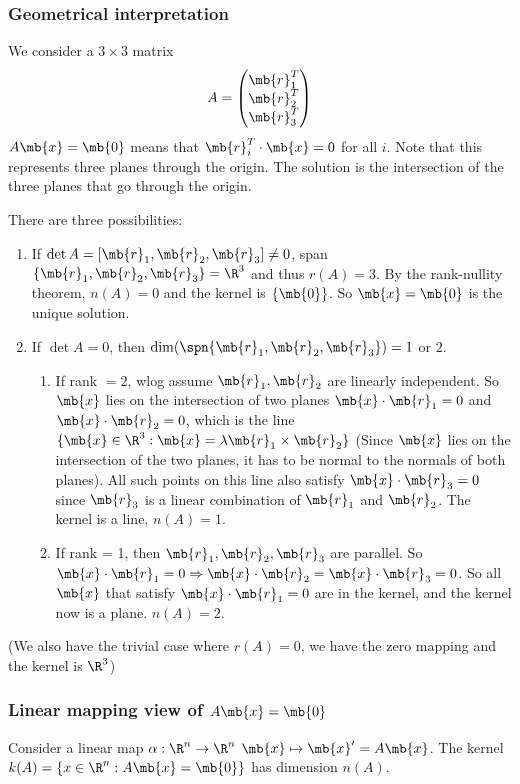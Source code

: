 \documentclass[a4paper]{article}
\begin{document}
\subsubsection{Geometrical interpretation}
We consider a $3\times 3$ matrix
\[
A = \begin{pmatrix} \mb{r}_1^T\\\mb{r}_2^T\\\mb{r}_3^T\end{pmatrix}
\]
$A\mb{x} = \mb{0}$ means that $\mb{r}_i^T\cdot \mb{x} = 0$ for all $i$. Note that this represents three planes through the origin. The solution is the intersection of the three planes that go through the origin.

There are three possibilities:
\begin{enumerate}
\item If $\det A =[\mb{r}_1, \mb{r}_2, \mb{r}_3] \not= 0$, span$\{\mb{r}_1, \mb{r}_2, \mb{r}_3\} = \R^3$ and thus $r(A) = 3$. By the rank-nullity theorem, $n(A) = 0$ and the kernel is $\{\mb{0}\}$. So $\mb{x} = \mb{0}$ is the unique solution.
\item If $\det A = 0$, then  $\dim(\spn\{\mb{r}_1, \mb{r}_2, \mb{r}_3\}) = 1$ or $2$.
  \begin{enumerate}
  \item If rank $= 2$, wlog assume $\mb{r}_1, \mb{r}_2$ are linearly independent. So $\mb{x}$ lies on the intersection of two planes $\mb{x}\cdot \mb{r}_1 = 0$ and $\mb{x}\cdot \mb{r}_2 = 0$, which is the line $\{\mb{x}\in \R^3: \mb{x} = \lambda \mb{r}_1\times \mb{r}_2\}$ (Since $\mb{x}$ lies on the intersection of the two planes, it has to be normal to the normals of both planes). All such points on this line also satisfy $\mb{x}\cdot\mb{r}_3 = 0$ since $\mb{r}_3$ is a linear combination of $\mb{r}_1$ and $\mb{r}_2$. The kernel is a line, $n(A) = 1$.
  \item If rank = 1, then $\mb{r}_1, \mb{r}_2, \mb{r}_3$ are parallel. So $\mb{x}\cdot \mb{r}_1 = 0 \Rightarrow \mb{x}\cdot \mb{r}_2 = \mb{x}\cdot \mb{r}_3 = 0$. So all $\mb{x}$ that satisfy $\mb{x}\cdot \mb{r}_1 = 0$ are in the kernel, and the kernel now is a plane. $n(A) = 2$.
  \end{enumerate}
\end{enumerate}
(We also have the trivial case where $r(A) = 0$, we have the zero mapping and the kernel is $\R^3$)

\subsubsection{Linear mapping view of \texorpdfstring{$A\mb{x} = \mb{0}$}{Ax = 0}}
Consider a linear map $\alpha: \R^n \to \R^n$ $\mb{x} \mapsto \mb{x}' = A\mb{x}$. The kernel $k(A) = \{x\in \R^n: A\mb{x} = \mb{0}\}$ has dimension $n(A)$.
\end{document}
